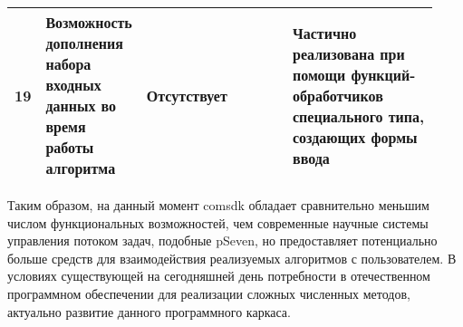 \begin{landscape}
\begin{longtable}{|p{0.03\linewidth}|p{0.2\linewidth}|p{0.35\linewidth}|p{0.35\linewidth}|}
        19         & Возможность дополнения набора входных данных во время работы алгоритма                     & Отсутствует                                                                                                                                                                                                                                                                                                                                                                                                                                                                                                                                                                                                                                                        & Частично реализована при помощи функций-обработчиков специального типа, создающих формы ввода                                                                                                                                                                                                    \\
        \hline
    \end{longtable}
\end{landscape}

Таким образом, на данный момент comsdk обладает сравнительно меньшим числом функциональных возможностей, чем современные научные системы управления потоком задач, подобные pSeven, но предоставляет потенциально больше средств для взаимодействия реализуемых алгоритмов с пользователем. В условиях существующей на сегодняшней день потребности в отечественном программном обеспечении для реализации сложных численных методов, актуально развитие данного программного каркаса.

